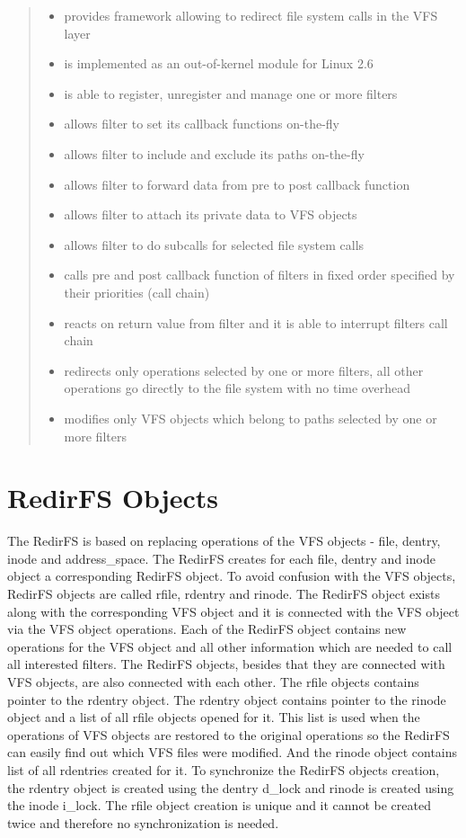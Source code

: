 \documentclass[oneside, 11pt, a4]{article}
\begin{document}
\begin{abstract}
\begin{itemize}
\item provides framework allowing to redirect file system calls in the VFS layer
\item is implemented as an out-of-kernel module for Linux 2.6
\item is able to register, unregister and manage one or more filters
\item allows filter to set its callback functions on-the-fly
\item allows filter to include and exclude its paths on-the-fly
\item allows filter to forward data from pre to post callback function
\item allows filter to attach its private data to VFS objects
\item allows filter to do subcalls for selected file system calls
\item calls pre and post callback function of filters in fixed order specified by
their priorities (call chain) 
\item reacts on return value from filter and it is able to interrupt filters call
chain
\item redirects only operations selected by one or more filters, all other
operations go directly to the file system with no time overhead
\item modifies only VFS objects which belong to paths selected by one or more
filters
\end{itemize}

\end{abstract}

\section{RedirFS Objects}
The RedirFS is based on replacing operations of the VFS objects - file, dentry,
inode and address\_space. The RedirFS creates for each file, dentry and inode
object a corresponding RedirFS object. To avoid confusion with the VFS objects,
RedirFS objects are called rfile, rdentry and rinode. The RedirFS object exists
along with the corresponding VFS object and it is connected with the VFS object
via the VFS object operations. Each of the RedirFS object contains new
operations for the VFS object and all other information which are needed to call
all interested filters. The RedirFS objects, besides that they are connected
with VFS objects, are also connected with each other. The rfile objects contains
pointer to the rdentry object. The rdentry object contains pointer to the rinode
object and a list of all rfile objects opened for it. This list is used when the
operations of VFS objects are restored to the original operations so the RedirFS
can easily find out which VFS files were modified. And the rinode object
contains list of all rdentries created for it. To synchronize the RedirFS
objects creation, the rdentry object is created using the dentry d\_lock and
rinode is created using the inode i\_lock. The rfile object creation is unique
and it cannot be created twice and therefore no synchronization is needed.
\end{document}
